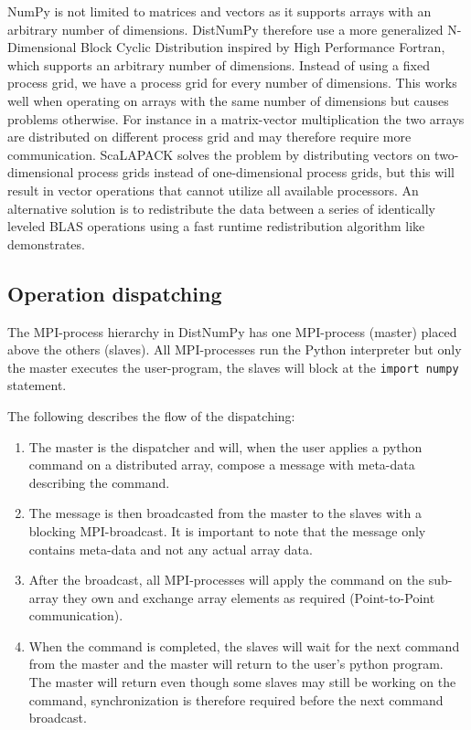 \documentclass{sigplanconf}
\begin{document}
NumPy is not limited to matrices and vectors as it supports arrays with an arbitrary number of dimensions. DistNumPy therefore use a more generalized N-Dimensional Block Cyclic Distribution inspired by High Performance Fortran\cite{Loveman93}, which supports an arbitrary number of dimensions. Instead of using a fixed process grid, we have a process grid for every number of dimensions. This works well when operating on arrays with the same number of dimensions but causes problems otherwise. For instance in a matrix-vector multiplication the two arrays are distributed on different process grid and may therefore require more communication. ScaLAPACK solves the problem by distributing vectors on two-dimensional process grids instead of one-dimensional process grids, but this will result in vector operations that cannot utilize all available processors. An alternative solution is to redistribute the data between a series of identically leveled BLAS operations using a fast runtime redistribution algorithm like \cite{PrylliT97} demonstrates.


\subsection{Operation dispatching}
The MPI-process hierarchy in DistNumPy has one MPI-process (master) placed above the others (slaves). All MPI-processes run the Python interpreter but only the master executes the user-program, the slaves will block at the \texttt{import numpy} statement. 

The following describes the flow of the dispatching:
\begin{enumerate}
\item The master is the dispatcher and will, when the user applies a python command on a distributed array, compose a message with meta-data describing the command. 
\item The message is then broadcasted from the master to the slaves with a blocking MPI-broadcast. It is important to note that the message only contains meta-data and not any actual array data.
\item After the broadcast, all MPI-processes will apply the command on the sub-array they own and exchange array elements as required (Point-to-Point communication).
\item When the command is completed, the slaves will wait for the next command from the master and the master will return to the user's python program. The master will return even though some slaves may still be working on the command, synchronization is therefore required before the next command broadcast.
\end{enumerate}
\end{document}
